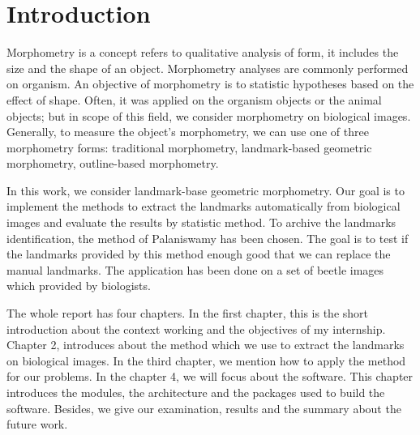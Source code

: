 \chapter*{Introduction}
Morphometry is a concept refers to qualitative analysis of form, it includes the size and the shape of an object. Morphometry analyses are commonly performed on organism. An objective of morphometry is to statistic hypotheses based on the effect of shape. Often, it was applied on the organism objects or the animal objects; but in scope of this field, we consider morphometry on biological images. Generally, to measure the object's morphometry, we can use one of three morphometry forms: traditional morphometry, landmark-based geometric morphometry, outline-based morphometry.  

In this work, we consider landmark-base geometric morphometry. Our goal is to implement the methods to extract the landmarks automatically from biological images and evaluate the results by statistic method. To archive the landmarks identification, the method of Palaniswamy\cite{palaniswamy2010automatic} has been chosen. The goal is to test if the landmarks provided by this method enough good that we can replace the manual landmarks. The application has been done on a set of beetle images which provided by biologists.

The whole report has four chapters. In the first chapter, this is the short introduction about the context working and the objectives of my internship. Chapter 2, introduces about the method which we use to extract the landmarks on biological images. In the third chapter, we mention how to apply the method for our problems. In the chapter 4, we will focus about the software. This chapter introduces the modules, the architecture and the packages used to build the software. Besides, we give our examination, results and the summary about the future work.